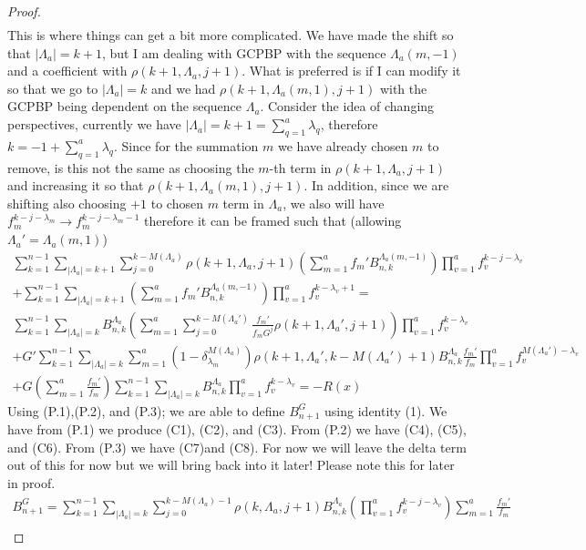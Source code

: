 \documentclass[11pt]{article}
\theoremstyle{plain}
\theoremstyle{definition}
\begin{document}
\begin{proof}
\begin{align*}
\end{align*}
This is where things can get a bit more complicated. We have made the shift so that $|\Lambda_a|=k+1$, but I am dealing with GCPBP with the sequence $\Lambda_a(m,-1)$ and a coefficient with $\rho(k+1,\Lambda_a,j+1)$. What is preferred is if I can modify it so that we go to $|\Lambda_a|=k$ and we had $\rho(k+1,\Lambda_a(m,1),j+1)$ with the GCPBP being dependent on the sequence $\Lambda_a$. Consider the idea of changing perspectives, currently we have $|\Lambda_a| = k+1 = \sum_{q=1}^a\lambda_q$, therefore $k=-1+\sum_{q=1}^a \lambda_q$. Since for the summation $m$ we have already chosen $m$ to remove, is this not the same as choosing the $m$-th term in $\rho(k+1,\Lambda_a,j+1)$ and increasing it so that $\rho(k+1,\Lambda_a(m,1),j+1)$. In addition, since we are shifting also choosing $+1$ to chosen $m$ term in $\Lambda_a$, we also will have $f_m^{k-j-\lambda_m} \xrightarrow{} f_m^{k-j-\lambda_m-1} $ therefore it can be framed such that (allowing $\Lambda_a' = \Lambda_a(m,1)$)
\begin{align*}
\sum_{k=1}^{n-1} \sum_{|\Lambda_a|=k+1}\sum_{j=0}^{k-M(\Lambda_a)} \rho(k+1,\Lambda_a,j+1)\left(\sum_{m=1}^af_m'B_{n,k}^{\Lambda_a(m,-1)}\right) \prod_{v=1}^a f_v^{k-j-\lambda_v} \\
    +\sum_{k=1}^{n-1} \sum_{|\Lambda_a|=k+1}\left(\sum_{m=1}^af_m'B_{n,k}^{\Lambda_a(m,-1)}\right) \prod_{v=1}^a f_v^{k-\lambda_v+1} = \\
    \sum_{k=1}^{n-1} \sum_{|\Lambda_a|=k} B_{n,k}^{\Lambda_a}\left(\sum_{m=1}^a \sum_{j=0}^{k-M(\Lambda_a')}\frac{f_m'}{f_mG^j}\rho(k+1,\Lambda_a',j+1)\right) \prod_{v=1}^a f_v^{k-\lambda_v} \\
    +G'\sum_{k=1}^{n-1} \sum_{|\Lambda_a|=k}\sum_{m=1}^a (1-\delta_{\lambda_m}^{M(\Lambda_a)})\rho(k+1,\Lambda_a',k-M(\Lambda_a')+1)B_{n,k}^{\Lambda_a}\frac{f_m'}{f_m}\prod_{v=1}^a f_v^{M(\Lambda_a')-\lambda_v}\\
    +G\left(\sum_{m=1}^a\frac{f_m'}{f_m}\right)\sum_{k=1}^{n-1} \sum_{|\Lambda_a|=k}B_{n,k}^{\Lambda_a} \prod_{v=1}^a f_v^{k-\lambda_v} = -R(x) \tag{P.3}
\end{align*}
Using (P.1),(P.2), and (P.3); we are able to define $B_{n+1}^G$ using identity (1). We have from (P.1) we produce (C1), (C2), and (C3). From (P.2) we have (C4), (C5), and (C6). From (P.3) we have (C7)and (C8). For now we will leave the delta term out of this for now but we will bring back into it later! Please note this for later in proof.
\begin{align*}
B_{n+1}^G = \sum_{k=1}^{n-1} \sum_{|\Lambda_a|=k} \sum_{j=0}^{k-M(\Lambda_a)-1} \rho(k,\Lambda_a,j+1) B_{n,k}^{\Lambda_a}\left(\prod_{v=1}^af_v^{k-j-\lambda_v}\right) \sum_{m=1}^a \frac{f_m'}{f_m} \tag{C1}\\

\end{align*}
\end{proof}
\end{document}
